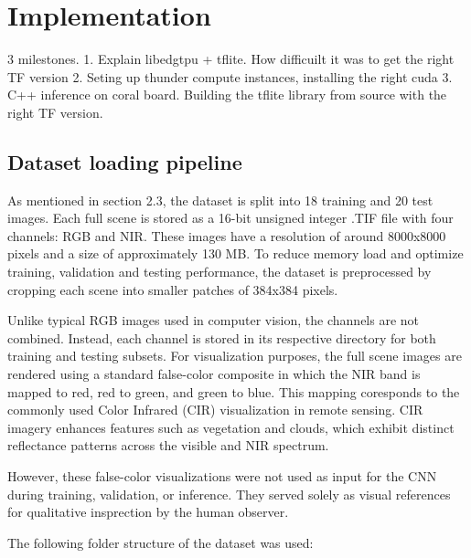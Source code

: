{

\setlength{\parindent}{0pt}
\setlength{\parskip}{1em}

\section{Implementation}


3 milestones.
1. Explain libedgtpu + tflite. How difficuilt it was to get the right TF version
2. Seting up thunder compute instances, installing the right cuda
3. C++ inference on coral board. Building the tflite library from source with the right TF version. 


\subsection{Dataset loading pipeline}

As mentioned in section 2.3, the dataset is split into 18 training and 20 test images. Each full scene is stored as a 16-bit unsigned integer .TIF file with four channels: RGB and NIR.  These images have a resolution of around 8000x8000 pixels and a size of approximately 130 MB. To reduce memory load and optimize training, validation and testing performance, the dataset is preprocessed by cropping each scene into smaller patches of 384x384 pixels.

Unlike typical RGB images used in computer vision, the channels are not combined. Instead, each channel is stored in its respective directory for both training and testing subsets. For visualization purposes, the full scene images are rendered using a standard false-color composite in which the NIR band is mapped to red, red to green, and green to blue. This mapping coresponds to the commonly used Color Infrared (CIR) visualization in remote sensing. CIR imagery enhances features such as vegetation and clouds, which exhibit distinct reflectance patterns across the visible and NIR spectrum.

However, these false-color visualizations were not used as input for the CNN during training, validation, or inference. They served solely as visual references for qualitative insprection by the human observer.


The following folder structure of the dataset was used:

}
